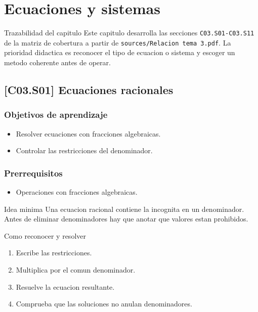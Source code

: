 \chapter{Ecuaciones y sistemas}

\begin{theorybox}{Trazabilidad del capitulo}
Este capitulo desarrolla las secciones \texttt{C03.S01-C03.S11} de la matriz de cobertura a
partir de \texttt{sources/Relacion tema 3.pdf}. La prioridad didactica es reconocer el tipo de
ecuacion o sistema y escoger un metodo coherente antes de operar.
\end{theorybox}

\section{[C03.S01] Ecuaciones racionales}

\subsection*{Objetivos de aprendizaje}
\begin{itemize}
  \item Resolver ecuaciones con fracciones algebraicas.
  \item Controlar las restricciones del denominador.
\end{itemize}

\subsection*{Prerrequisitos}
\begin{itemize}
  \item Operaciones con fracciones algebraicas.
\end{itemize}

\begin{theorybox}{Idea minima}
Una ecuacion racional contiene la incognita en un denominador. Antes de eliminar denominadores
hay que anotar que valores estan prohibidos.
\end{theorybox}

\begin{methodbox}{Como reconocer y resolver}
\begin{enumerate}
  \item Escribe las restricciones.
  \item Multiplica por el comun denominador.
  \item Resuelve la ecuacion resultante.
  \item Comprueba que las soluciones no anulan denominadores.
\end{enumerate}
\end{methodbox}

